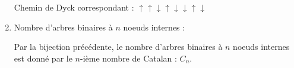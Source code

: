 \documentclass[10pt,a4paper]{article}
\begin{document}
\begin{enumerate}
    Chemin de Dyck correspondant :
    \(
    \uparrow \uparrow \downarrow \uparrow \downarrow \downarrow \uparrow \downarrow
    \)

    \item Nombre d'arbres binaires à \( n \) noeuds internes :

    Par la bijection précédente, le nombre d'arbres binaires à \( n \) noeuds internes est donné par
    le \( n \)-ième nombre de Catalan : \( C_n \).

\end{enumerate}
\end{document}
